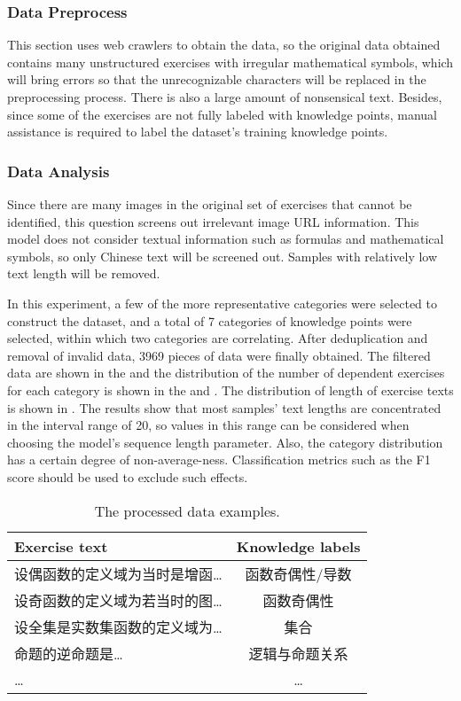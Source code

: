 \subsubsection{Data Preprocess}
This section uses web crawlers to obtain the data, so the original data obtained contains many unstructured exercises with irregular mathematical symbols, which will bring errors so that the unrecognizable characters will be replaced in the preprocessing process. There is also a large amount of nonsensical text. Besides, since some of the exercises are not fully labeled with knowledge points, manual assistance is required to label the dataset's training knowledge points.


\subsubsection{Data Analysis}
Since there are many images in the original set of exercises that cannot be identified, this question screens out irrelevant image URL information. This model does not consider textual information such as formulas and mathematical symbols, so only Chinese text will be screened out. Samples with relatively low text length will be removed.

In this experiment, a few of the more representative categories were selected to construct the dataset, and a total of 7 categories of knowledge points were selected, within which two categories are correlating. After deduplication and removal of invalid data, 3969 pieces of data were finally obtained. The filtered data are shown in the \tblname{\ref{tbl:ch2-rawdata}} and the distribution of the number of dependent exercises for each category is shown in the \tblname{\ref{tbl:ch2-rawdata-dist}} and \figname{\ref{fig:ch2-data-belonging}}. The distribution of length of exercise texts is shown in \figname{\ref{fig:ch2-data-lendis}}. The results show that most samples' text lengths are concentrated in the interval range of 20, so values in this range can be considered when choosing the model's sequence length parameter. Also, the category distribution has a certain degree of non-average-ness. Classification metrics such as the F1 score should be used to exclude such effects.

\begin{table}[htb]
    \caption{The processed data examples.}\label{tbl:ch2-rawdata}
    \centering
    \begin{tabular}{l c}
        \toprule
        Exercise text                      & Knowledge labels \\
        \midrule
        设偶函数的定义域为当时是增函\ldots & 函数奇偶性/导数  \\
        设奇函数的定义域为若当时的图\ldots & 函数奇偶性       \\
        设全集是实数集函数的定义域为\ldots & 集合             \\
        命题的逆命题是\ldots               & 逻辑与命题关系   \\
        \ldots                             & \ldots           \\
        \bottomrule
    \end{tabular}
\end{table}

